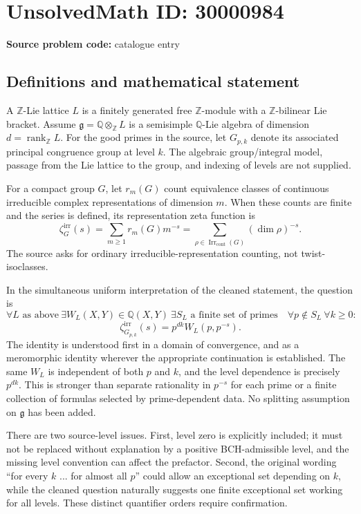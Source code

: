 \documentclass[11pt]{article}
\newcommand{\Z}{\mathbb{Z}}
\newcommand{\Q}{\mathbb{Q}}
\begin{document}
\section*{UnsolvedMath ID: 30000984}
\textbf{Source problem code:} catalogue entry
\subsection{Definitions and mathematical statement}
A \(\Z\)-Lie lattice \(L\) is a finitely generated free \(\Z\)-module with a \(\Z\)-bilinear Lie bracket. Assume \(\mathfrak g=\Q\otimes_\Z L\) is a semisimple \(\Q\)-Lie algebra of dimension \(d=\operatorname{rank}_\Z L\). For the good primes in the source, let \(G_{p,k}\) denote its associated principal congruence group at level \(k\). The algebraic group/integral model, passage from the Lie lattice to the group, and indexing of levels are not supplied.

For a compact group \(G\), let \(r_m(G)\) count equivalence classes of continuous irreducible complex representations of dimension \(m\). When these counts are finite and the series is defined, its representation zeta function is
\[
 \zeta_G^{\mathrm{irr}}(s)=\sum_{m\geq1}r_m(G)m^{-s}
 =\sum_{\rho\in\operatorname{Irr}_{\mathrm{cont}}(G)}(\dim\rho)^{-s}.
\]
The source asks for ordinary irreducible-representation counting, not twist-isoclasses.

In the simultaneous uniform interpretation of the cleaned statement, the question is
\[
 \forall L\text{ as above}\ \exists W_L(X,Y)\in\Q(X,Y)\
 \exists S_L\text{ a finite set of primes}\quad
 \forall p\notin S_L\ \forall k\geq0:
\]
\[
 \zeta_{G_{p,k}}^{\mathrm{irr}}(s)=p^{dk}W_L(p,p^{-s}).
\]
The identity is understood first in a domain of convergence, and as a meromorphic identity wherever the appropriate continuation is established. The same \(W_L\) is independent of both \(p\) and \(k\), and the level dependence is precisely \(p^{dk}\). This is stronger than separate rationality in \(p^{-s}\) for each prime or a finite collection of formulas selected by prime-dependent data. No splitting assumption on \(\mathfrak g\) has been added.

There are two source-level issues. First, level zero is explicitly included; it must not be replaced without explanation by a positive BCH-admissible level, and the missing level convention can affect the prefactor. Second, the original wording ``for every \(k\) ... for almost all \(p\)'' could allow an exceptional set depending on \(k\), while the cleaned question naturally suggests one finite exceptional set working for all levels. These distinct quantifier orders require confirmation.
\end{document}
